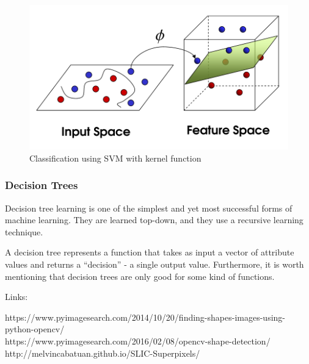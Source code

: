 \begin{figure}[!h]
	\centering
	\includegraphics[scale=0.3]{fig/kernel_function.png}
	\caption{Classification using SVM with kernel function \cite{Opencv2017}}
	\label{fig:kernelfunction}
\end{figure}

\subsubsection*{Decision Trees}
Decision tree learning is one of the simplest and yet most successful forms of machine learning. They are learned top-down, and they use a recursive learning technique.

A decision tree represents a function that takes as input a vector of attribute values and returns a “decision” - a single output value. Furthermore, it is worth mentioning that decision trees are only good for some kind of functions.

Links:

https://www.pyimagesearch.com/2014/10/20/finding-shapes-images-using-python-opencv/\\
https://www.pyimagesearch.com/2016/02/08/opencv-shape-detection/
\\
http://melvincabatuan.github.io/SLIC-Superpixels/
\\
